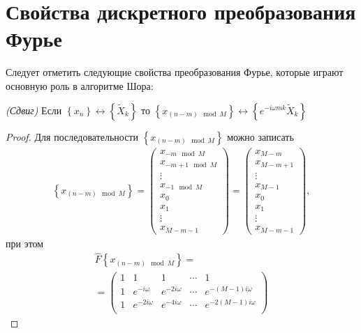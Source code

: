 \section{Свойства дискретного преобразования Фурье}
Следует отметить следующие свойства преобразования Фурье, которые
играют основную роль в алгоритме Шора:

\begin{lemma}
\emph{(Сдвиг)}
\label{lemmaAddFourierDiscretFourierShiftTime}
Если $\left\{x_n\right\} \longleftrightarrow \left\{\tilde{X}_k\right\}$ то
$\left\{x_{\left(n - m\right) \mod M}\right\} \longleftrightarrow
\left\{e^{-i \omega m k}\tilde{X}_k\right\}$ 
\end{lemma}

\begin{proof}
Для последовательности $\left\{x_{\left(n - m\right) \mod M}\right\}$
можно записать
\begin{eqnarray}
\left\{x_{\left(n - m\right) \mod M}\right\} = 
\begin{pmatrix}
x_{-m \mod M} \\
x_{-m+1 \mod M}\\ 
\vdots \\
x_{-1 \mod M}\\
x_0 \\
x_1 \\
\vdots \\
x_{M - m - 1}
\end{pmatrix} = 
\begin{pmatrix}
x_{M - m} \\
x_{M - m + 1}\\ 
\vdots \\
x_{M - 1}\\
x_0 \\
x_1 \\
\vdots \\
x_{M - m - 1}
\end{pmatrix},
\nonumber
\end{eqnarray}
при этом
\begin{eqnarray}
\hat{F}\left\{x_{\left(n - m\right) \mod M}\right\} = 
\nonumber \\
=
\begin{pmatrix}
1 & 1 & 1 & \cdots & 1 \\
1 & e^{-i \omega} & e^{-2 i \omega} & \cdots & 
e^{-\left( M - 1 \right) i \omega} \\
1 & e^{-2 i \omega} & e^{-4 i \omega} & \cdots & 
e^{-2 \left( M - 1 \right) i \omega} \\

\end{pmatrix}
\end{eqnarray}
\end{proof}
